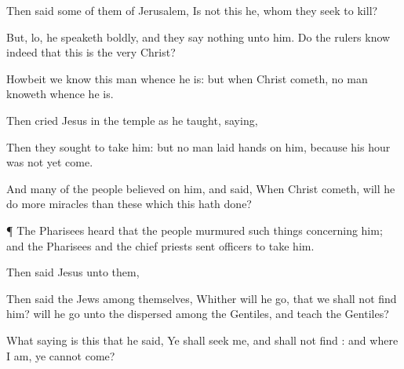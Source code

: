 {



Then
said
some
of them of
Jerusalem,
Is
not
this
he,
whom they
seek to
kill?

But,
lo, he
speaketh
boldly,
and they
say
nothing unto
him.
Do the
rulers
know
indeed
that
this
is the
very
Christ?

Howbeit we
know this
man
whence he
is:
but
when
Christ
cometh, no
man
knoweth
whence he
is.

Then
cried
Jesus
in the
temple as he
taught,
saying,
{}


Then they
sought to
take
him:
but no
man
laid
hands
on
him,
because
his
hour
was not
yet
come.

And
many
of the
people
believed
on
him,
and
said,
When
Christ
cometh, will he
do
more
miracles than
these
which
this
{} hath
done?


\par }{\PP {}¶ The
Pharisees
heard
that the
people
murmured such
things
concerning
him;
and the
Pharisees
and the chief
priests
sent
officers
to
take
him.

Then
said
Jesus unto
them,
{}


Then
said the
Jews
among
themselves,
Whither
will
he
go,
that
we
shall
not
find
him? will
he
go
unto the
dispersed among the
Gentiles,
and
teach the
Gentiles?

What
{}
saying
is
this
that he
said, Ye shall
seek
me,
and
shall
not
find
{}:
and
where
I
am,
{}
ye
cannot
come?

}
